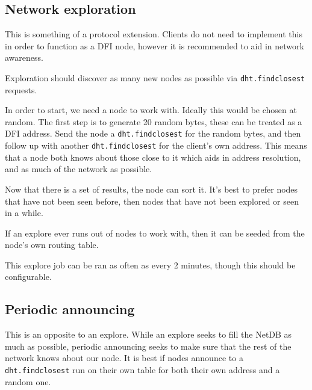 	\subsection{Network exploration}
	\begin{multicols}{2}
	This is something of a protocol extension. Clients do not need to implement
	this in order to function as a DFI node, however it is recommended to aid in
	network awareness.

	Exploration should discover as many new nodes as possible via
	\texttt{dht.findclosest} requests. 

	In order to start, we need a node to work with. Ideally this would be chosen at random.
	The first step is to generate 20 random bytes, these can be treated as a DFI
	address. Send the node a \texttt{dht.findclosest} for the random bytes, and
	then follow up with another \texttt{dht.findclosest} for the client's own
	address. This means that a node both knows about those close to it which
	aids in address resolution, and as much of the network as possible.

	Now that there is a set of results, the node can sort it. It's best to
	prefer nodes that have not been seen before, then nodes
	that have not been explored or seen in a while. 

	If an explore ever runs out of nodes to work with, then it can be seeded
	from the node's own routing table.

	This explore job can be ran as often as every 2 minutes, though this should
	be configurable.
	\end{multicols}

	\subsection{Periodic announcing}
	\begin{multicols}{2}
		This is an opposite to an explore. While an explore seeks
		to fill the NetDB as much as possible, periodic announcing seeks to make
		sure that the rest of the network knows about our node. It is
		best if nodes announce to a \texttt{dht.findclosest} run on their own
		table for both their own address and a random one.
	\end{multicols}

